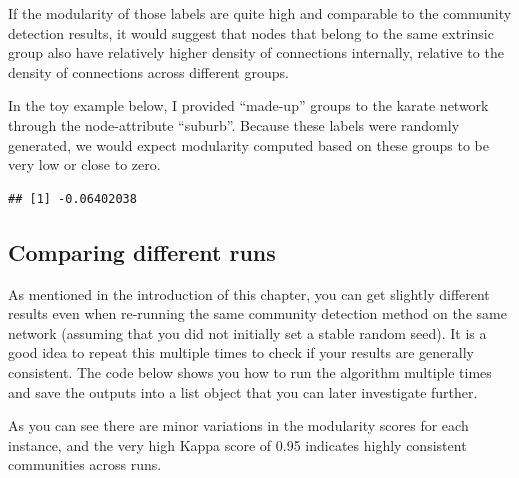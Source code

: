 \documentclass[
]{book}
\newenvironment{Shaded}{\begin{snugshade}}{\end{snugshade}}
\newcommand{\AttributeTok}[1]{\textcolor[rgb]{0.13,0.29,0.53}{#1}}
\newcommand{\CommentTok}[1]{\textcolor[rgb]{0.56,0.35,0.01}{\textit{#1}}}
\newcommand{\ConstantTok}[1]{\textcolor[rgb]{0.56,0.35,0.01}{#1}}
\newcommand{\DecValTok}[1]{\textcolor[rgb]{0.00,0.00,0.81}{#1}}
\newcommand{\FunctionTok}[1]{\textcolor[rgb]{0.13,0.29,0.53}{\textbf{#1}}}
\newcommand{\NormalTok}[1]{#1}
\newcommand{\OtherTok}[1]{\textcolor[rgb]{0.56,0.35,0.01}{#1}}
\newcommand{\SpecialCharTok}[1]{\textcolor[rgb]{0.81,0.36,0.00}{\textbf{#1}}}
\begin{document}
If the modularity of those labels are quite high and comparable to the community detection results, it would suggest that nodes that belong to the same extrinsic group also have relatively higher density of connections internally, relative to the density of connections across different groups.

In the toy example below, I provided ``made-up'' groups to the karate network through the node-attribute ``suburb''. Because these labels were randomly generated, we would expect modularity computed based on these groups to be very low or close to zero.

\begin{Shaded}
\end{Shaded}

\begin{verbatim}
## [1] -0.06402038
\end{verbatim}

\subsection{Comparing different runs}\label{comparing-different-runs}

As mentioned in the introduction of this chapter, you can get slightly different results even when re-running the same community detection method on the same network (assuming that you did not initially set a stable random seed). It is a good idea to repeat this multiple times to check if your results are generally consistent. The code below shows you how to run the algorithm multiple times and save the outputs into a list object that you can later investigate further.

As you can see there are minor variations in the modularity scores for each instance, and the very high Kappa score of 0.95 indicates highly consistent communities across runs.
\end{document}

